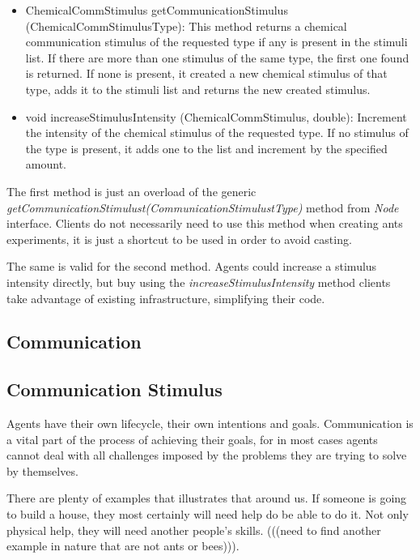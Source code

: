 \begin{itemize}
  \item ChemicalCommStimulus getCommunicationStimulus (ChemicalCommStimulusType): This method returns a chemical communication stimulus of the requested type if any is present in the stimuli list. If there are more than one stimulus of the same type, the first one found is returned. If none is present, it created a new chemical stimulus of that type, adds it to the stimuli list and returns the new created stimulus.

  \item void increaseStimulusIntensity (ChemicalCommStimulus, double): Increment the intensity of the chemical stimulus of the requested type. If no stimulus of the type is present, it adds one to the list and increment by the specified amount.
\end{itemize}

The first method is just an overload of the generic \emph{getCommunicationStimulust(CommunicationStimulustType)} method from \emph{Node} interface. Clients do not necessarily need to use this method when creating ants experiments, it is just a shortcut to be used in order to avoid casting.

The same is valid for the second method. Agents could increase a stimulus intensity directly, but buy using the \emph{increaseStimulusIntensity} method clients take advantage of existing infrastructure, simplifying their code.

\subsection {Communication}
\label{subsec:comm-stimulus}

\subsection{Communication Stimulus}

Agents have their own lifecycle, their own intentions and goals. Communication is a vital part of the process of achieving their goals, for in most cases agents cannot deal with all challenges imposed by the problems they are trying to solve by themselves.

There are plenty of examples that illustrates that around us. If someone is going to build a house, they most certainly will need help do be able to do it. Not only physical help, they will need another people's skills. (((need to find another example in nature that are not ants or bees))).

